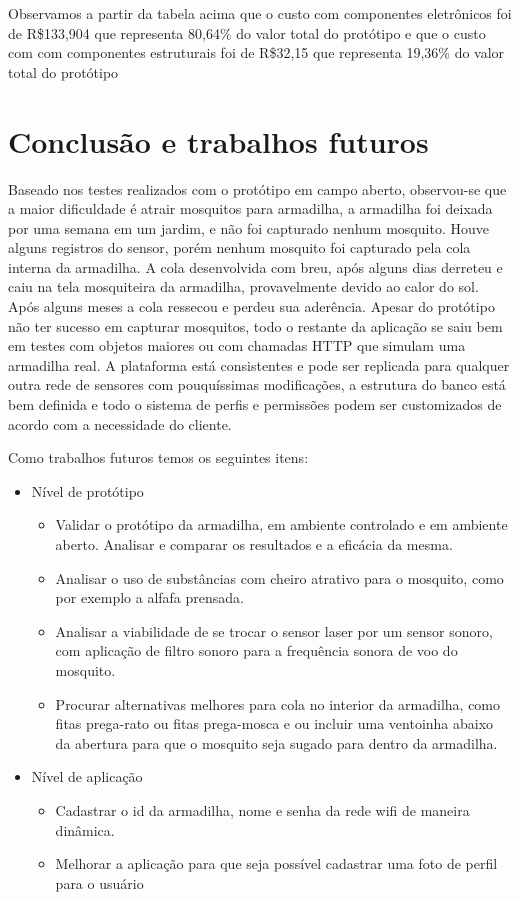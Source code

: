 \documentclass[
	12pt,				%
	openright,			%
	oneside,			%
	a4paper,			%
	chapter=TITLE,		%
	english,			%
	brazil				%
	]{abntex2}
\begin{document}
Observamos a partir da tabela acima que o custo com componentes eletrônicos foi de R\$133,904 que representa 80,64\% do valor total do protótipo e que o custo com 
com componentes estruturais foi de R\$32,15 que representa 19,36\% do valor total do protótipo

\chapter{Conclusão e trabalhos futuros}

Baseado nos testes realizados com o protótipo em campo aberto, observou-se que a maior dificuldade é atrair mosquitos para armadilha, a armadilha foi deixada por uma semana em
um jardim, e não foi capturado nenhum mosquito. Houve alguns registros do  sensor, porém nenhum mosquito foi capturado pela cola interna da armadilha. A cola desenvolvida com breu,
após alguns dias derreteu e caiu na tela mosquiteira da armadilha, provavelmente devido ao calor do sol. Após alguns meses a cola ressecou e perdeu sua aderência. Apesar do protótipo
não ter sucesso em capturar mosquitos, todo o restante da aplicação se saiu bem em testes com objetos maiores ou com chamadas HTTP que simulam uma armadilha real. A plataforma está 
consistentes e pode ser replicada para qualquer outra rede de sensores com pouquíssimas modificações, a estrutura do banco está bem definida e todo o sistema de perfis e 
permissões podem ser customizados de acordo com a necessidade do cliente.

Como trabalhos futuros temos os seguintes itens: 

\begin{itemize}
    \item Nível de protótipo
    \begin{itemize}
        \item Validar o protótipo da armadilha, em ambiente controlado e em ambiente aberto. Analisar e comparar os resultados e a eficácia da mesma.
        \item Analisar o uso de substâncias com cheiro atrativo para o mosquito, como por exemplo a alfafa prensada.
        \item Analisar a viabilidade de se trocar o sensor laser por um sensor sonoro, com aplicação de filtro sonoro para a frequência sonora de voo do mosquito.
        \item Procurar alternativas melhores para cola no interior da armadilha, como fitas prega-rato ou fitas prega-mosca e ou incluir uma 
        ventoinha abaixo da abertura para que o mosquito seja sugado para dentro da armadilha.
    \end{itemize}
    \item Nível de aplicação
    \begin{itemize}
        \item Cadastrar o id da armadilha, nome e senha da rede wifi de maneira dinâmica.
        \item Melhorar a aplicação para que seja possível cadastrar uma foto de perfil para o usuário
    \end{itemize}   
\end{itemize}
\end{document}
